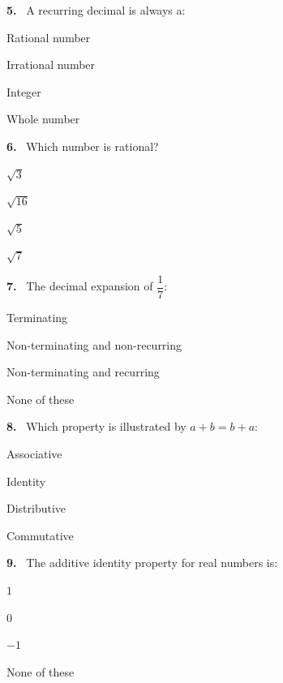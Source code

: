 \documentclass[11pt]{article}
\newenvironment{qenv}[1]{%
  \par\medskip\noindent\textbf{#1.}\ \ignorespaces
}{\par}
\begin{document}
\begin{qenv}{5} A recurring decimal is always a:
\begin{options} \item Rational number \item Irrational number \item Integer \item Whole number \end{options} \end{qenv}

\begin{qenv}{6} Which number is rational?
\begin{options} \item $\sqrt{3}$ \item $\sqrt{16}$ \item $\sqrt{5}$ \item $\sqrt{7}$ \end{options} \end{qenv}

\begin{qenv}{7} The decimal expansion of $\dfrac{1}{7}$:
\begin{options} \item Terminating \item Non-terminating and non-recurring \item Non-terminating and recurring \item None of these \end{options} \end{qenv}

\begin{qenv}{8} Which property is illustrated by $a+b=b+a$:
\begin{options} \item Associative \item Identity \item Distributive \item Commutative \end{options} \end{qenv}

\begin{qenv}{9} The additive identity property for real numbers is:
\begin{options} \item $1$ \item $0$ \item $-1$ \item None of these \end{options} \end{qenv}
\end{document}
